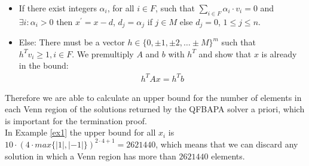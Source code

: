 \documentclass{book}
\theoremstyle{break}
\theoremstyle{definition}
\begin{document}
\begin{itemize}
\item If there exist integers $\alpha_i$, for all $i\in F$, such that $\sum_{i\in F}\alpha_i\cdot v_i=0$ and $\exists i: \alpha_i>0$ then $x^\prime=x-d$, $d_j=\alpha_j$ if $j\in M$ else $d_j=0$, $1\leq j\leq n$.
\item Else: There must be a vector $h\in\{0,\pm 1,\pm 2,\dots \pm M\}^m$ such that $h^T v_i\geq1, i\in F$. We premultiply $A$ and $b$ with $h^T$ and show that $x$ is already in the bound:
\begin{align*}
h^TA x = h^Tb
\end{align*}
\end{itemize}
Therefore we are able to calculate an upper bound for the number of elements in each Venn region of the solutions returned by the QFBAPA solver a priori, which is important for the termination proof.\\
In Example \ref{ex1} the upper bound for all $x_i$ is $10\cdot (4\cdot max\{|1|,|-1|\})^{2\cdot 4+1}=2621440$, which means that we can discard any solution in which a Venn region has more than $2621440$ elements.
\end{document}
